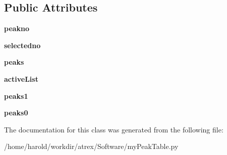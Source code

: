 \subsection*{Public Attributes}
\begin{DoxyCompactItemize}
\item 
\hypertarget{classmyPeakTable_1_1myPeakTable_ac5e5fdd422bfd17223d9424c75ac5e57}{{\bfseries peakno}}\label{classmyPeakTable_1_1myPeakTable_ac5e5fdd422bfd17223d9424c75ac5e57}

\item 
\hypertarget{classmyPeakTable_1_1myPeakTable_aa7213ccc67f2d998076ef95396d53d01}{{\bfseries selectedno}}\label{classmyPeakTable_1_1myPeakTable_aa7213ccc67f2d998076ef95396d53d01}

\item 
\hypertarget{classmyPeakTable_1_1myPeakTable_a4e6db53861997b42cc4886dca5593b4d}{{\bfseries peaks}}\label{classmyPeakTable_1_1myPeakTable_a4e6db53861997b42cc4886dca5593b4d}

\item 
\hypertarget{classmyPeakTable_1_1myPeakTable_a59227cea4995b2a3a5b7423ccb0d712c}{{\bfseries active\-List}}\label{classmyPeakTable_1_1myPeakTable_a59227cea4995b2a3a5b7423ccb0d712c}

\item 
\hypertarget{classmyPeakTable_1_1myPeakTable_ac746b90e0b88d62891770a0c82a6366c}{{\bfseries peaks1}}\label{classmyPeakTable_1_1myPeakTable_ac746b90e0b88d62891770a0c82a6366c}

\item 
\hypertarget{classmyPeakTable_1_1myPeakTable_af40587b94cba8e86cd5e790a2f6eb062}{{\bfseries peaks0}}\label{classmyPeakTable_1_1myPeakTable_af40587b94cba8e86cd5e790a2f6eb062}

\end{DoxyCompactItemize}


The documentation for this class was generated from the following file\-:\begin{DoxyCompactItemize}
\item 
/home/harold/workdir/atrex/\-Software/my\-Peak\-Table.\-py\end{DoxyCompactItemize}
